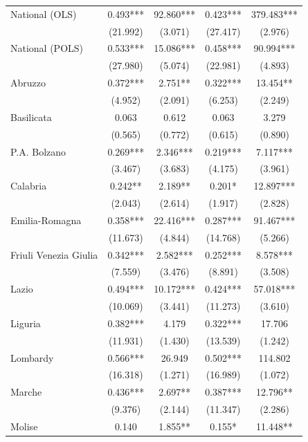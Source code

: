 \documentclass[12pt]{article}
\begin{document}
\begin{appendices}
\begin{longtable}{@{}lcccc@{}}
            National (OLS) & 0.493*** & 92.860*** & 0.423*** & 379.483*** \\ 
             & (21.992) & (3.071) & (27.417) & (2.976) \\ 
            National (POLS) & 0.533*** & 15.086*** & 0.458*** & 90.994*** \\ 
             & (27.980) & (5.074) & (22.981) & (4.893) \\ 
            Abruzzo & 0.372*** & 2.751** & 0.322*** & 13.454** \\ 
             & (4.952) & (2.091) & (6.253) & (2.249) \\ 
            Basilicata & 0.063 & 0.612 & 0.063 & 3.279 \\ 
             & (0.565) & (0.772) & (0.615) & (0.890) \\ 
            P.A. Bolzano & 0.269*** & 2.346*** & 0.219*** & 7.117*** \\ 
             & (3.467) & (3.683) & (4.175) & (3.961) \\ 
            Calabria & 0.242** & 2.189** & 0.201* & 12.897*** \\ 
             & (2.043) & (2.614) & (1.917) & (2.828) \\ 
            Emilia-Romagna & 0.358*** & 22.416*** & 0.287*** & 91.467*** \\ 
             & (11.673) & (4.844) & (14.768) & (5.266) \\ 
            Friuli Venezia Giulia & 0.342*** & 2.582*** & 0.252*** & 8.578*** \\ 
             & (7.559) & (3.476) & (8.891) & (3.508) \\ 
            Lazio & 0.494*** & 10.172*** & 0.424*** & 57.018*** \\ 
             & (10.069) & (3.441) & (11.273) & (3.610) \\ 
            Liguria & 0.382*** & 4.179 & 0.322*** & 17.706 \\ 
             & (11.931) & (1.430) & (13.539) & (1.242) \\ 
            Lombardy & 0.566*** & 26.949 & 0.502*** & 114.802 \\ 
             & (16.318) & (1.271) & (16.989) & (1.072) \\ 
            Marche & 0.436*** & 2.697** & 0.387*** & 12.796** \\ 
             & (9.376) & (2.144) & (11.347) & (2.286) \\ 
            Molise & 0.140 & 1.855** & 0.155* & 11.448** \\ 

\end{longtable}
\end{appendices}
\end{document}

